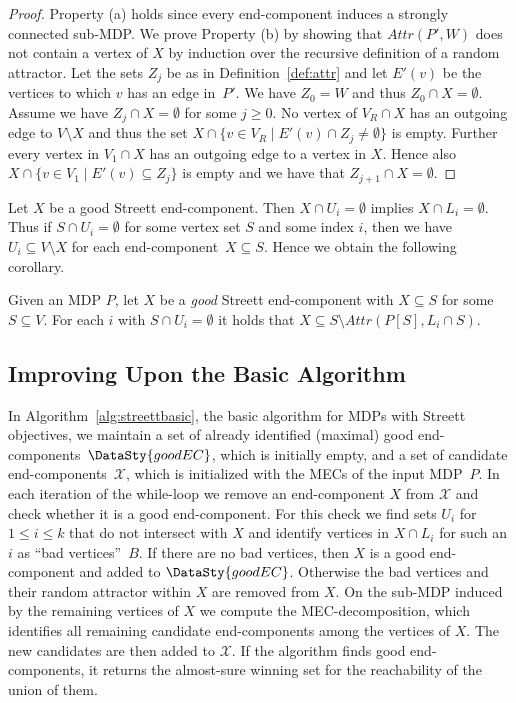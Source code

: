 \documentclass[11pt,letterpaper]{article}
\newcommand{\set}[1]{\{#1\}}
\newcommand{\lu}{\textup{(}}
\newcommand{\ru}{\textup{)}\xspace}
\newcommand{\upbr}[1]{\lu #1\ru}
\newcommand{\at}{\mathit{Attr}}
\newcommand{\mdp}{P\xspace}
\newcommand{\vo}{V_1\xspace}
\newcommand{\vr}{V_R\xspace}
\newcommand{\ec}{X\xspace}
\newcommand{\good}{\DataSty{goodEC}}
\newcommand{\badv}{B\xspace}
\begin{document}
\begin{proof}
	Property \upbr{a} holds since every end-component induces a strongly connected
	sub-MDP. We prove Property \upbr{b} by showing that $\at(\mdp', W)$
	does not contain a vertex of $\ec$ by induction over the recursive 
	definition of a random attractor. Let the sets $Z_j$ be as in
	Definition~\ref{def:attr} and let $E'(v)$ be the vertices to which $v$ has an 
	edge in~$\mdp'$. 
	We have $Z_0 = W$ and thus $Z_0 \cap \ec = \emptyset$.
	Assume we have $Z_j \cap \ec = \emptyset$ for some $j \ge 0$. No vertex of
	$\vr \cap \ec$ has an outgoing edge to $V \setminus \ec$ and thus the set 
	$\ec \cap \set{v \in \vr \mid E'(v) \cap Z_j \ne \emptyset}$ is empty.
	Further every vertex in $\vo \cap \ec$ has an outgoing edge to a vertex in $\ec$.
	Hence also $\ec \cap \set{v \in \vo \mid E'(v) \subseteq Z_j}$ is empty
	and we have that $Z_{j+1} \cap \ec = \emptyset$.
\end{proof}

Let $\ec$ be a good Streett end-component. Then $\ec \cap U_i = \emptyset$ implies 
$\ec \cap L_i = \emptyset$. Thus if $S \cap U_i = \emptyset$ for some vertex 
set $S$ and some index $i$, then we have $U_i \subseteq V \setminus \ec$ 
for each end-component~$\ec \subseteq S$. Hence we obtain the 
following corollary.

\begin{corollary}\label{cor:geccontained}
Given an MDP $\mdp$, let $\ec$ be a \emph{good} Streett end-component with 
$X \subseteq S$ for some $S \subseteq V$. 
For each $i$ with $S \cap U_i = \emptyset$ it holds that 
$\ec \subseteq S \setminus \at(\mdp[S],  L_i \cap S)$.
\end{corollary}

\subsection{Improving Upon the Basic Algorithm}\label{sec:streettimpr}

In Algorithm~\ref{alg:streettbasic}, the basic algorithm for MDPs with Streett 
objectives, we maintain a set of already identified 
(maximal) good end-components~$\good$, which is initially empty, and a set of 
candidate end-components~$\mathcal{\ec}$, which is initialized with the 
MECs of the input MDP~$\mdp$. In each iteration of the while-loop we remove 
an end-component $\ec$ from $\mathcal{\ec}$ and check whether it is a 
good end-component. For this check we find sets $U_i$ for $1 \le i \le k$ 
that do not intersect with $\ec$ and identify vertices in $\ec \cap L_i$ for 
such an $i$ as ``bad vertices''~$\badv$. If there are no bad vertices, then
$\ec$ is a good end-component and added to $\good$. Otherwise the bad 
vertices and their random attractor within $\ec$ are removed from $\ec$.
On the sub-MDP induced by the remaining vertices of $\ec$ we compute the 
MEC-decomposition, which identifies all remaining candidate end-components among
the vertices of $\ec$. The new candidates are then added to $\mathcal{\ec}$.
If the algorithm finds good end-components, it returns the almost-sure winning set
for the reachability of the union of them.
\end{document}
